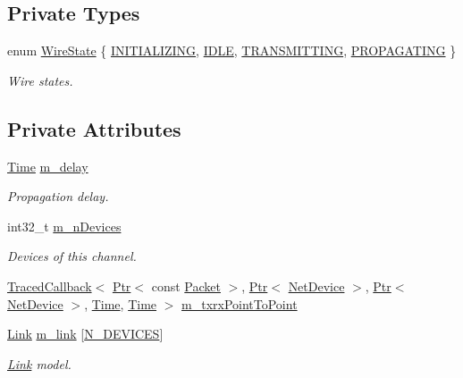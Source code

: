 \subsection*{Private Types}
\begin{DoxyCompactItemize}
\item 
enum \hyperlink{classns3_1_1PointToPointChannel_a9baea8f4a74b839330bd7c7b0825a2a1}{Wire\+State} \{ \hyperlink{classns3_1_1PointToPointChannel_a9baea8f4a74b839330bd7c7b0825a2a1aed4eeade93ebec701795225bbc507345}{I\+N\+I\+T\+I\+A\+L\+I\+Z\+I\+NG}, 
\hyperlink{classns3_1_1PointToPointChannel_a9baea8f4a74b839330bd7c7b0825a2a1aebfa4f0bc7099a5294506c3654786972}{I\+D\+LE}, 
\hyperlink{classns3_1_1PointToPointChannel_a9baea8f4a74b839330bd7c7b0825a2a1a9deffd015210489f2126bd8d196fa50f}{T\+R\+A\+N\+S\+M\+I\+T\+T\+I\+NG}, 
\hyperlink{classns3_1_1PointToPointChannel_a9baea8f4a74b839330bd7c7b0825a2a1a6fbb19c01e9c15c53372b0298313a6b9}{P\+R\+O\+P\+A\+G\+A\+T\+I\+NG}
 \}\begin{DoxyCompactList}\small\item\em Wire states. \end{DoxyCompactList}
\end{DoxyCompactItemize}
\subsection*{Private Attributes}
\begin{DoxyCompactItemize}
\item 
\hyperlink{classns3_1_1Time}{Time} \hyperlink{classns3_1_1PointToPointChannel_abaf8b917578c2ff90629cf663db47412}{m\+\_\+delay}
\begin{DoxyCompactList}\small\item\em Propagation delay. \end{DoxyCompactList}\item 
int32\+\_\+t \hyperlink{classns3_1_1PointToPointChannel_a1eb8bdbc8340e051b43275bd0932185d}{m\+\_\+n\+Devices}
\begin{DoxyCompactList}\small\item\em Devices of this channel. \end{DoxyCompactList}\item 
\hyperlink{classns3_1_1TracedCallback}{Traced\+Callback}$<$ \hyperlink{classns3_1_1Ptr}{Ptr}$<$ const \hyperlink{classns3_1_1Packet}{Packet} $>$, \hyperlink{classns3_1_1Ptr}{Ptr}$<$ \hyperlink{classns3_1_1NetDevice}{Net\+Device} $>$, \hyperlink{classns3_1_1Ptr}{Ptr}$<$ \hyperlink{classns3_1_1NetDevice}{Net\+Device} $>$, \hyperlink{classns3_1_1Time}{Time}, \hyperlink{classns3_1_1Time}{Time} $>$ \hyperlink{classns3_1_1PointToPointChannel_ab6758265946f321dc3d2d36040902eb6}{m\+\_\+txrx\+Point\+To\+Point}
\item 
\hyperlink{classns3_1_1PointToPointChannel_1_1Link}{Link} \hyperlink{classns3_1_1PointToPointChannel_a3f58f5090b715716f8f278bf5482a7aa}{m\+\_\+link} \mbox{[}\hyperlink{classns3_1_1PointToPointChannel_aa40520f14e7c17c01a563f5d89f67d5b}{N\+\_\+\+D\+E\+V\+I\+C\+ES}\mbox{]}
\begin{DoxyCompactList}\small\item\em \hyperlink{classns3_1_1PointToPointChannel_1_1Link}{Link} model. \end{DoxyCompactList}\end{DoxyCompactItemize}
